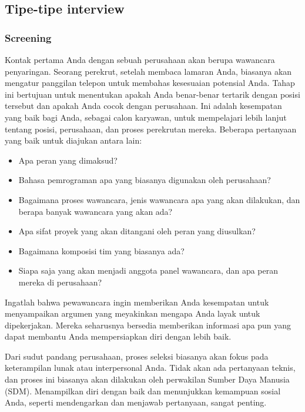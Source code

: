 \documentclass{article}
\begin{document}
\subsection{Tipe-tipe interview}
\subsubsection{Screening}
Kontak pertama Anda dengan sebuah perusahaan akan berupa wawancara penyaringan. Seorang perekrut, setelah membaca lamaran Anda, biasanya akan mengatur panggilan telepon untuk membahas kesesuaian potensial Anda. Tahap ini bertujuan untuk menentukan apakah Anda benar-benar tertarik dengan posisi tersebut dan apakah Anda cocok dengan perusahaan. Ini adalah kesempatan yang baik bagi Anda, sebagai calon karyawan, untuk mempelajari lebih lanjut tentang posisi, perusahaan, dan proses perekrutan mereka. Beberapa pertanyaan yang baik untuk diajukan antara lain:
\begin{itemize}
    \item Apa peran yang dimaksud?
    \item Bahasa pemrograman apa yang biasanya digunakan oleh perusahaan?
    \item Bagaimana proses wawancara, jenis wawancara apa yang akan dilakukan, dan berapa banyak wawancara yang akan ada?
    \item Apa sifat proyek yang akan ditangani oleh peran yang diusulkan?
    \item Bagaimana komposisi tim yang biasanya ada?
    \item Siapa saja yang akan menjadi anggota panel wawancara, dan apa peran mereka di perusahaan?
\end{itemize}
Ingatlah bahwa pewawancara ingin memberikan Anda kesempatan untuk menyampaikan argumen yang meyakinkan mengapa Anda layak untuk dipekerjakan. Mereka seharusnya bersedia memberikan informasi apa pun yang dapat membantu Anda mempersiapkan diri dengan lebih baik.

Dari sudut pandang perusahaan, proses seleksi biasanya akan fokus pada keterampilan lunak atau interpersonal Anda. Tidak akan ada pertanyaan teknis, dan proses ini biasanya akan dilakukan oleh perwakilan Sumber Daya Manusia (SDM). Menampilkan diri dengan baik dan menunjukkan kemampuan sosial Anda, seperti mendengarkan dan menjawab pertanyaan, sangat penting.
\end{document}
